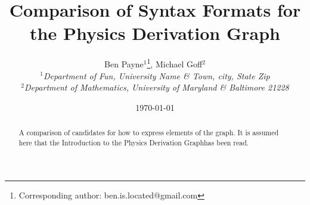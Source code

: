 \documentclass{article}
\newcommand{\pdg}{Physics Derivation Graph}
\begin{document}
\title{Comparison of Syntax Formats for the Physics Derivation Graph}

\author{Ben Payne$^{1}$\footnote{Corresponding author: ben.is.located@gmail.com}, Michael Goff$^{2}$\\
{\it $^{1}$Department of Fun, University Name \& Town, city, State Zip}\\
{\it $^{2}$Department of Mathematics, University of Maryland \& Baltimore 21228}}

\date{\today}


\maketitle %

\begin{abstract}
A comparison of candidates for how to express elements of the graph. It is assumed here that the Introduction to the \pdg has been read. 
\end{abstract}
\end{document}

